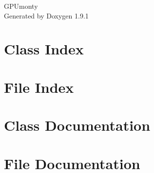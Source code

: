 \let\mypdfximage\pdfximage\def\pdfximage{\immediate\mypdfximage}\documentclass[twoside]{book}
\newcommand{\+}{\discretionary{\mbox{\scriptsize$\hookleftarrow$}}{}{}}
\newcommand{\clearemptydoublepage}{%
  \newpage{\pagestyle{empty}\cleardoublepage}%
}
\begin{document}
\raggedbottom

\hypersetup{pageanchor=false,
             bookmarksnumbered=true,
             pdfencoding=unicode
            }
\begin{titlepage}
\vspace*{7cm}
\begin{center}%
{\Large GPUmonty }\\
\vspace*{1cm}
{\large Generated by Doxygen 1.9.1}\\
\end{center}
\end{titlepage}
\clearemptydoublepage
{}
\tableofcontents
\clearemptydoublepage
{}
\hypersetup{pageanchor=true}

\chapter{Class Index}

\chapter{File Index}

\chapter{Class Documentation}





\chapter{File Documentation}




















\backmatter
\newpage
{}
\clearemptydoublepage
{}
\printindex
\end{document}
